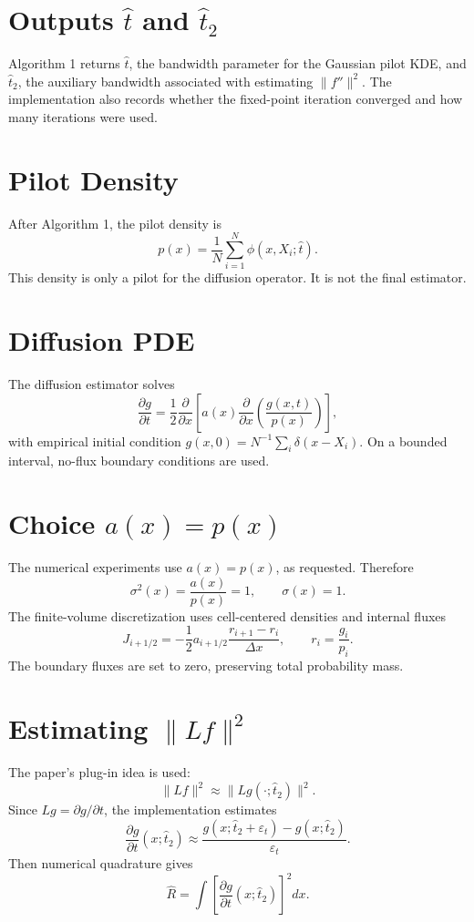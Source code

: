 \documentclass[11pt]{article}
\begin{document}
\section{Outputs \(\widehat t\) and \(\widehat t_2\)}

Algorithm 1 returns \(\widehat t\), the bandwidth parameter for the Gaussian
pilot KDE, and \(\widehat t_2\), the auxiliary bandwidth associated with
estimating \(\|f''\|^2\). The implementation also records whether the
fixed-point iteration converged and how many iterations were used.

\section{Pilot Density}

After Algorithm 1, the pilot density is
\[
p(x)
=
\frac{1}{N}\sum_{i=1}^N \phi(x,X_i;\widehat t).
\]
This density is only a pilot for the diffusion operator. It is not the final
estimator.

\section{Diffusion PDE}

The diffusion estimator solves
\[
\frac{\partial g}{\partial t}
=
\frac{1}{2}\frac{\partial}{\partial x}
\left[
a(x)\frac{\partial}{\partial x}
\left(\frac{g(x,t)}{p(x)}\right)
\right],
\]
with empirical initial condition \(g(x,0)=N^{-1}\sum_i\delta(x-X_i)\).
On a bounded interval, no-flux boundary conditions are used.

\section{Choice \(a(x)=p(x)\)}

The numerical experiments use \(a(x)=p(x)\), as requested. Therefore
\[
\sigma^2(x)=\frac{a(x)}{p(x)}=1,
\qquad
\sigma(x)=1.
\]
The finite-volume discretization uses cell-centered densities and internal
fluxes
\[
J_{i+1/2}
=
-\frac{1}{2}a_{i+1/2}
\frac{r_{i+1}-r_i}{\Delta x},
\qquad
r_i=\frac{g_i}{p_i}.
\]
The boundary fluxes are set to zero, preserving total probability mass.

\section{Estimating \(\|Lf\|^2\)}

The paper's plug-in idea is used:
\[
\|Lf\|^2
\approx
\|Lg(\cdot;\widehat t_2)\|^2.
\]
Since \(Lg=\partial g/\partial t\), the implementation estimates
\[
\frac{\partial g}{\partial t}(x;\widehat t_2)
\approx
\frac{
g(x;\widehat t_2+\varepsilon_t)
-
g(x;\widehat t_2)
}{\varepsilon_t}.
\]
Then numerical quadrature gives
\[
\widehat R
=
\int
\left[
\frac{\partial g}{\partial t}(x;\widehat t_2)
\right]^2 dx.
\]
\end{document}
